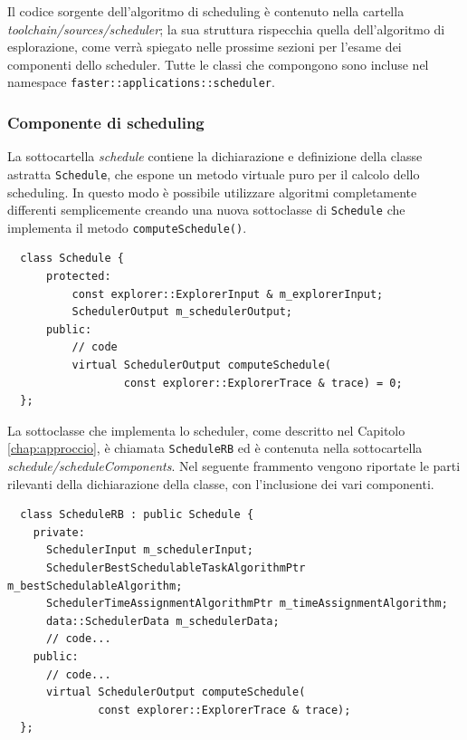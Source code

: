 Il codice sorgente dell'algoritmo di scheduling è contenuto nella cartella 
\emph{toolchain/sources/scheduler}; la sua struttura rispecchia quella 
dell'algoritmo di esplorazione, come verrà spiegato nelle prossime sezioni per 
l'esame dei componenti dello scheduler. Tutte le classi che compongono 
sono incluse nel namespace \verb+faster::applications::scheduler+.

\subsubsection{Componente di scheduling}
La sottocartella \emph{schedule} contiene la dichiarazione e definizione della 
classe astratta \verb+Schedule+, che espone un metodo virtuale puro per il 
calcolo dello scheduling. In questo modo è possibile utilizzare algoritmi 
completamente differenti semplicemente creando una nuova sottoclasse di 
\verb+Schedule+ che implementa il metodo \verb+computeSchedule()+.
\newline
\begin{verbatim}
  class Schedule {
      protected:
          const explorer::ExplorerInput & m_explorerInput;
          SchedulerOutput m_schedulerOutput;
      public:
          // code
          virtual SchedulerOutput computeSchedule(
                  const explorer::ExplorerTrace & trace) = 0;
  };
\end{verbatim}

La sottoclasse che implementa lo scheduler, come descritto nel Capitolo 
\ref{chap:approccio}, è chiamata \verb+ScheduleRB+ ed è contenuta nella 
sottocartella \emph{schedule/scheduleComponents}. Nel seguente frammento 
vengono riportate le parti rilevanti della dichiarazione della classe, con 
l'inclusione dei vari componenti.
\newline
\begin{verbatim}
  class ScheduleRB : public Schedule {
    private:
      SchedulerInput m_schedulerInput;
      SchedulerBestSchedulableTaskAlgorithmPtr m_bestSchedulableAlgorithm;
      SchedulerTimeAssignmentAlgorithmPtr m_timeAssignmentAlgorithm;
      data::SchedulerData m_schedulerData;
      // code...
    public:
      // code...
      virtual SchedulerOutput computeSchedule(
              const explorer::ExplorerTrace & trace);
  };
\end{verbatim}

